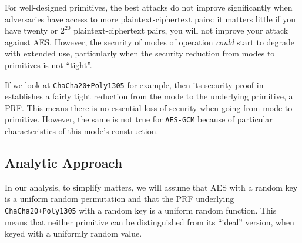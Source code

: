 \documentclass{article}
\begin{document}
For well-designed primitives, the best attacks do not improve significantly when adversaries have access to more plaintext-ciphertext pairs: it matters little if you have twenty or $2^{20}$ plaintext-ciphertext pairs, you will not improve your attack against AES. However, the security of modes of operation \emph{could} start to degrade with extended use, particularly when the security reduction from modes to primitives is not ``tight''.

If we look at \texttt{ChaCha20+Poly1305} for example, then its security proof in~\cite{DBLP:journals/iacr/Procter14a} establishes a fairly tight reduction from the mode to the underlying primitive, a PRF. This means there is no essential loss of security when going from mode to primitive. 
However, the same is not true for \texttt{AES-GCM} because of particular characteristics of this mode's construction.




\subsection{Analytic Approach}
In our analysis, to simplify matters, we will assume that AES with a random key is a uniform random permutation and that the PRF underlying \texttt{ChaCha20+Poly1305} with a random key is a uniform random function. This means that neither primitive can be distinguished from its ``ideal'' version, when keyed with a uniformly random value. %
\end{document}

